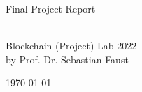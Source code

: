 \begin {center}

\vspace{1 in}

{\Huge Final Project Report}

\vspace {2 in}

{\Huge \textbf{\thetitle}} \\ 
\vspace{1 in}
{\Huge Blockchain (Project) Lab 2022} \\
{\huge by Prof. Dr. Sebastian Faust} \\

\vspace{0.5 in}

{\Large \today}

\vspace{1,5 in}

{\Large \textit \theauthor} 
\end {center}
